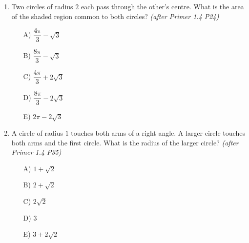 \documentclass[11pt,a4paper]{article}
\begin{document}
\begin{enumerate}
\item \begin{minipage}[t]{0.60\linewidth}
Two circles of radius $2$ each pass through the other's centre. What is the area of the shaded region common to both circles? \textit{\small(after Primer 1.4 P24)}
\begin{itemize}[itemsep=3pt]
\item[A)] $\dfrac{4\pi}{3}-\sqrt3$
\item[B)] $\dfrac{8\pi}{3}-\sqrt3$
\item[C)] $\dfrac{4\pi}{3}+2\sqrt3$
\item[D)] $\dfrac{8\pi}{3}-2\sqrt3$
\item[E)] $2\pi-2\sqrt3$
\end{itemize}
\end{minipage}\hfill
\begin{minipage}[t]{0.36\linewidth}
\vspace{0pt}
\centering
{}
\end{minipage}

\item \begin{minipage}[t]{0.60\linewidth}
A circle of radius $1$ touches both arms of a right angle. A larger circle touches both arms and the first circle. What is the radius of the larger circle? \textit{\small(after Primer 1.4 P35)}
\begin{itemize}
\item[A)] $1+\sqrt2$
\item[B)] $2+\sqrt2$
\item[C)] $2\sqrt2$
\item[D)] $3$
\item[E)] $3+2\sqrt2$
\end{itemize}
\end{minipage}\hfill
\begin{minipage}[t]{0.36\linewidth}
\vspace{0pt}
\centering
{}
\end{minipage}


\end{enumerate}
\end{document}
